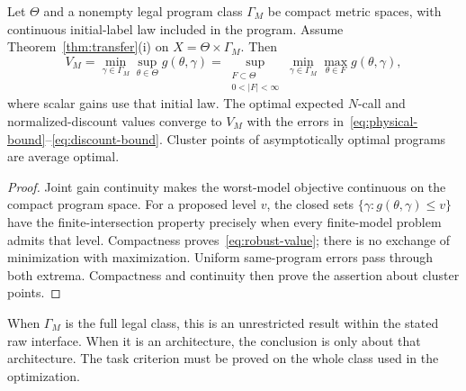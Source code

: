 \begin{corollary}\label{cor:robust}
Let $\Theta$ and a nonempty legal program class $\Gamma_M$ be compact metric spaces, with continuous initial-label law included in the program. Assume Theorem~\ref{thm:transfer}(i) on $X=\Theta\times\Gamma_M$. Then
\begin{equation}\label{eq:robust-value}
 V_M=\min_{\gamma\in\Gamma_M}\sup_{\theta\in\Theta}g(\theta,\gamma)
 =\sup_{\substack{F\subset\Theta\\0<|F|<\infty}}
       \min_{\gamma\in\Gamma_M}\max_{\theta\in F}g(\theta,\gamma),
\end{equation}
where scalar gains use that initial law. The optimal expected $N$-call and normalized-discount values converge to $V_M$ with the errors in~\eqref{eq:physical-bound}--\eqref{eq:discount-bound}. Cluster points of asymptotically optimal programs are average optimal.
\end{corollary}
\begin{proof}
Joint gain continuity makes the worst-model objective continuous on the compact program space. For a proposed level $v$, the closed sets $\{\gamma:g(\theta,\gamma)\le v\}$ have the finite-intersection property precisely when every finite-model problem admits that level. Compactness proves~\eqref{eq:robust-value}; there is no exchange of minimization with maximization. Uniform same-program errors pass through both extrema. Compactness and continuity then prove the assertion about cluster points.
\end{proof}
When $\Gamma_M$ is the full legal class, this is an unrestricted result within the stated raw interface. When it is an architecture, the conclusion is only about that architecture. The task criterion must be proved on the whole class used in the optimization.
